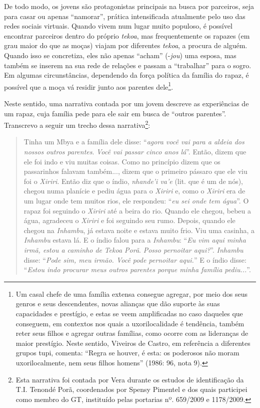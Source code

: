 De todo modo, os jovens são protagonistas principais na busca por
parceiros, seja para casar ou apenas ``namorar'', prática intensificada
atualmente pelo uso das redes sociais virtuais. Quando vivem num lugar
muito populoso, é possível encontrar parceiros dentro do próprio
\emph{tekoa}, mas frequentemente os rapazes (em grau maior do que as
moças) viajam por diferentes \emph{tekoa}, a procura de alguém. Quando
isso se concretiza, eles não apenas ``acham'' (-\emph{jou}) uma esposa,
mas também se inserem na sua rede de relações e passam a ``trabalhar''
para o sogro. Em algumas circunstâncias, dependendo da força política da
família do rapaz, é possível que a moça vá residir junto aos parentes
dele\footnote{Um casal chefe de uma família extensa consegue agregar,
  por meio dos seus genros e seus descendentes, novas alianças que dão
  suporte às suas capacidades e prestígio, e estas se veem amplificadas
  no caso daqueles que conseguem, em contextos nos quais a
  uxorilocalidade é tendência, também reter seus filhos e agregar outras
  famílias, como ocorre com as lideranças de maior prestígio. Neste
  sentido, Viveiros de Castro, em referência a diferentes grupos tupi,
  comenta: ``Regra se houver, é esta: os poderosos não moram
  uxorilocalmente, nem seus filhos homens'' (1986: 96, nota 9).}.

Neste sentido, uma narrativa contada por um jovem descreve as
experiências de um rapaz, cuja família pede para ele sair em busca de
``outros parentes''. Transcrevo a seguir um trecho dessa
narrativa\footnote{Esta narrativa foi contada por Vera durante os
  estudos de identificação da T.I. Tenondé Porã, coordenados por Spensy
  Pimentel e dos quais participei como membro do GT, instituído pelas
  portarias nº. 659/2009 e 1178/2009.}:

\begin{quote}
Tinha um Mbya e a família dele disse: ``\emph{agora você vai para a
aldeia dos nossos outros parentes}. \emph{Você vai passar cinco anos
lá}''. Então, dizem que ele foi indo e viu muitas coisas. Como no
princípio dizem que os passarinhos falavam também..., dizem que o
primeiro pássaro que ele viu foi o \emph{Xiriri}. Então diz que o índio,
\emph{nhande'i va'e} (lit. que é um de nós), chegou numa planície e
pediu água para o \emph{Xiriri} e, como o \emph{Xiriri} era de um lugar
onde tem muitos rios, ele respondeu: ``\emph{eu sei onde tem água}''. O
rapaz foi seguindo o \emph{Xiriri} até a beira do rio. Quando ele
chegou, bebeu a água, agradeceu o \emph{Xiriri} e foi seguindo seu rumo.
Depois, quando ele chegou na \emph{Inhambu}, já estava noite e estava
muito frio. Viu uma casinha, a \emph{Inhambu} estava lá. E o índio falou
para a \emph{Inhambu}: ``\emph{Eu vim aqui minha irmã, estou a caminho
de} \emph{Tekoa Porã}. \emph{Posso pernoitar aqui?}''. \emph{Inhambu}
disse: ``\emph{Pode sim, meu irmão. Você pode pernoitar aqui.}'' E o
índio disse: ``\emph{Estou indo procurar meus outros parentes porque
minha família pediu...}''.
\end{quote}

